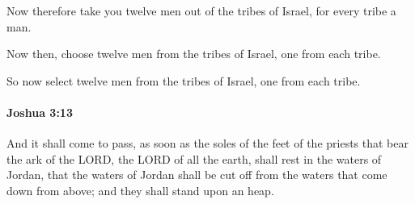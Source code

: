 			\begin{versebox}
					\item[BHS] 
					\item[ASV] Now therefore take you twelve men out of the tribes of Israel, for every tribe a man.
					\item[NIV] Now then, choose twelve men from the tribes of Israel, one from each tribe.
					\item[NRSV] So now select twelve men from the tribes of Israel, one from each tribe.
			\end{versebox}

		\paragraph{Joshua 3:13} %
			\label{JOSHUA-3-13}

			And it shall come to pass, as soon as the soles of the feet of the priests that bear the ark of the LORD, the LORD of all the earth, shall rest in the waters of Jordan, that the waters of Jordan shall be cut off from the waters that come down from above; and they shall stand upon an heap.

